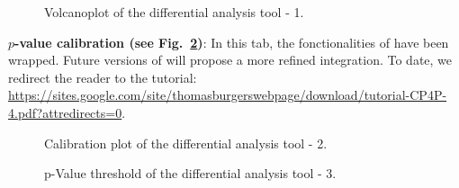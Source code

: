 \documentclass[12pt]{article}
\begin{document}
\begin {figure}
\centering
{}
\caption{Volcanoplot of the differential analysis tool - 1.}
\label{fig:anadiff1}
\end {figure}


\textbf{$p$-value calibration (see Fig.~\ref{fig:anadiff2})}: In this tab, 
the fonctionalities of  have been wrapped. Future versions of 
 will propose a more refined integration. To date, we 
redirect the reader to the  tutorial: 
\url{https://sites.google.com/site/thomasburgerswebpage/download/tutorial-CP4P-
4.pdf?attredirects=0}. 

\begin {figure}
\centering
{}
\caption{Calibration plot of the differential analysis tool - 2.}
\label{fig:anadiff2}
\end {figure}


\begin {figure}
\centering
{}
\caption{p-Value threshold of the differential analysis tool - 3.}
\label{fig:anadiff3}
\end {figure}
\end{document}
